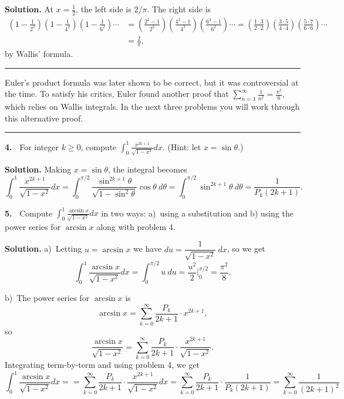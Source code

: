 \documentclass[12pt]{article}
\theoremstyle{definition}
\theoremstyle{remark}
\theoremstyle{definition}
\newenvironment{Solution}{\noindent\textbf{Solution.}}{}
\begin{document}
\begin{Solution}
At $x=\frac{1}{2}$, the left side is $2/\pi$. The right side is 
\[\begin{split}
\left(1-\frac{1}{2^2}\right)\left(1-\frac{1}{4^2}\right)
\left(1-\frac{1}{6^2}\right)\cdots
&=\left(\frac{2^2-1}{2^ 2}\right)
\left(\frac{4^2-1}{4^2}\right)
\left(\frac{6^2-1}{6^2}\right)\cdots
=\left(\frac{1\cdot 3}{2\cdot 2}\right)
\left(\frac{3\cdot 5}{4\cdot 4}\right)
\left(\frac{5\cdot 7}{6\cdot 6}\right)\cdots\\
&=\frac{2}{\pi},
\end{split}
\]
by Wallis' formula. 
\end{Solution}

\rule{\textwidth}{1pt}

Euler's product formula was later shown to be correct, but it was controversial at the time. 
To satisfy his critics,  Euler found another proof that  
$\sum\limits_{n=1}^\infty\frac{1}{n^2}=\frac{\pi^2}{6},$
which relies on Wallis integrals. 
In the next three problems you will work through this alternative proof. 

\rule{\textwidth}{1pt}

{\bf 4.\ } For integer $k\geq 0$, compute $\displaystyle \int_0^1\frac{x^{2k+1}}{\sqrt{1-x^2}} dx$. (Hint: let $x=\sin\theta$.)

\begin{Solution} Making $x=\sin\theta$, the integral becomes
\[\int_0^1\frac{x^{2k+1}}{\sqrt{1-x^2}} dx=
\int_0^{\pi/2}\frac{\sin^{2k+1}\theta}{\sqrt{1-\sin^2\theta}}\cos\theta\ d\theta=\int_0^{\pi/2}\sin^{2k+1}\theta\ d\theta=\frac{1}{P_k(2k+1)}.
\]
\end{Solution}

{\bf 5.\ } Compute $\displaystyle \int_0^1\frac{\arcsin x}{\sqrt{1-x^2}} dx$ in two ways:
a)\ using a substitution and b) using the power series for $\arcsin x$ along with problem 4.  

\begin{Solution} a)\ Letting $u=\arcsin x$ we have $du=\dfrac{1}{\sqrt{1-x^2}}\ dx$, so we get 
\[\int_0^1\frac{\arcsin x}{\sqrt{1-x^2}} dx=
\int_0^{\pi/2} u\ du=\frac{u^2}{2}\Big\vert_0^{\pi/2}=\frac{\pi^2}{8}.
\]

b)\ The power series for $\arcsin x$ is 
\[\arcsin x=\sum_{k=0}^\infty \frac{P_k}{2k+1}\cdot x^{2k+1},\]
so 
\[\frac{\arcsin x}{\sqrt{1-x^2}}
=\sum_{k=0}^\infty \frac{P_k}{2k+1}\cdot \frac{x^{2k+1}}
{\sqrt{1-x^2}}.\]
Integrating term-by-term and using problem 4, we get
\[\int_0^1\frac{\arcsin x}{\sqrt{1-x^2}} dx=
=\sum_{k=0}^\infty \frac{P_k}{2k+1}\cdot 
\frac{x^{2k+1}}{\sqrt{1-x^2}} dx
=\sum_{k=0}^\infty \frac{P_k}{2k+1}\cdot \frac{1}{P_k(2k+1)}
=\sum_{k=0}^\infty\frac{1}{(2k+1)^2}
\]
\end{Solution}
\end{document}
